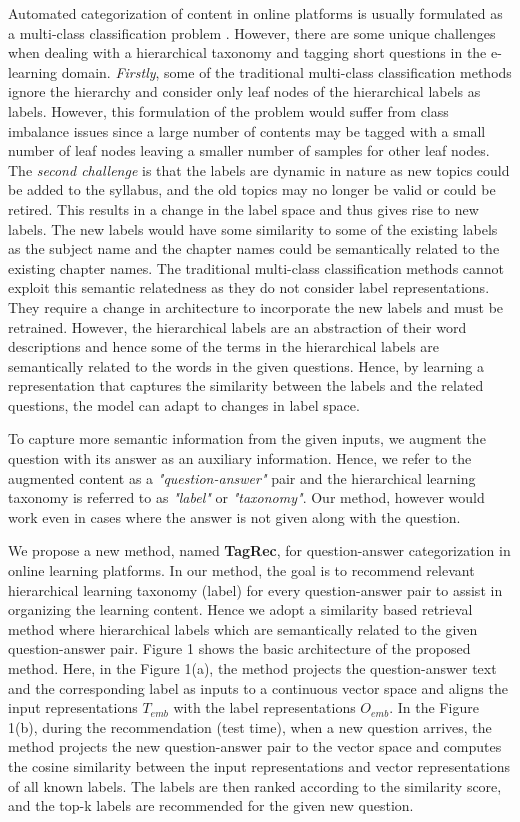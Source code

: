 \documentclass[runningheads, envcountsame, a4paper]{llncs}
\begin{document}
Automated categorization of content in online platforms is usually formulated as a multi-class classification problem \cite{xumulti,kozareva2015everyone}. However, there are some unique challenges when dealing with a hierarchical taxonomy and tagging short questions in the e-learning domain. \textit{Firstly}, some of the traditional multi-class classification methods ignore the hierarchy and consider only leaf nodes of the hierarchical labels as labels. However, this formulation of the problem would suffer from class imbalance issues since a large number of contents may be tagged with a small number of leaf nodes leaving a smaller number of samples for other leaf nodes. The \textit{second challenge} is that the labels are dynamic in nature as new topics could be added to the syllabus, and the old topics may no longer be valid or could be retired. This results in a change in the label space and thus gives rise to new labels. The new labels would have some similarity to some of the existing labels as the subject name and the chapter names could be semantically related to the existing chapter names. The traditional multi-class classification methods cannot exploit this semantic relatedness as they do not consider label representations. They require a change in architecture to incorporate the new labels and must be retrained. However, the hierarchical labels are an abstraction of their word descriptions and hence some of the terms in the hierarchical labels are semantically related to the words in the given questions. Hence, by learning a representation that captures the similarity between the labels and the related questions, the model can adapt to changes in label space.

To capture more semantic information from the given inputs, we augment the question with its answer as an auxiliary information. Hence, we refer to the augmented content as a \textit{"question-answer"} pair and the hierarchical learning taxonomy is referred to as \textit{"label"} or \textit{"taxonomy"}. Our method, however would work even in cases where the answer is not given along with the question.



We propose a new method, named \textbf{TagRec}, for question-answer categorization in online learning platforms. In our method, the goal is to recommend relevant hierarchical learning taxonomy (label) for every question-answer pair to assist in organizing the learning content. Hence we adopt a similarity based retrieval method where hierarchical labels which are semantically related to the given question-answer pair. Figure 1 shows the basic architecture of the proposed method. Here, in the Figure 1(a), the method projects the  question-answer text and the corresponding label as inputs to a continuous vector space and aligns the input representations $T_{emb}$ with the label representations $O_{emb}$. In the Figure 1(b), during the recommendation (test time), when a new question arrives, the method projects the new question-answer pair to the vector space and computes the cosine similarity between the input representations and vector representations of all known labels. The labels are then ranked according to the similarity score, and the top-k labels are recommended for the given new question.
\end{document}
